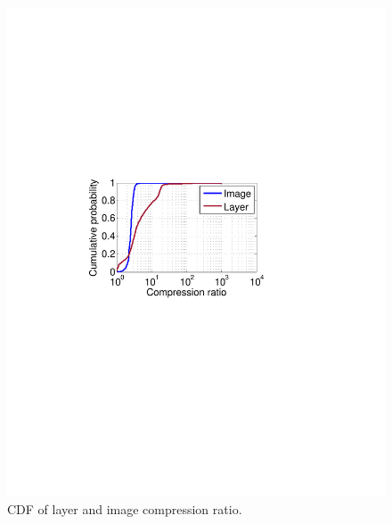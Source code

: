 \begin{figure}[t]
\begin{minipage}{0.22\textwidth}
		\includegraphics[width=1\textwidth]{graphs/compress-ratio-cdf.pdf}
		\caption{CDF of layer and image compression ratio.
		}
		\label{fig:compress-ratio}
	\end{minipage}
\end{figure}
